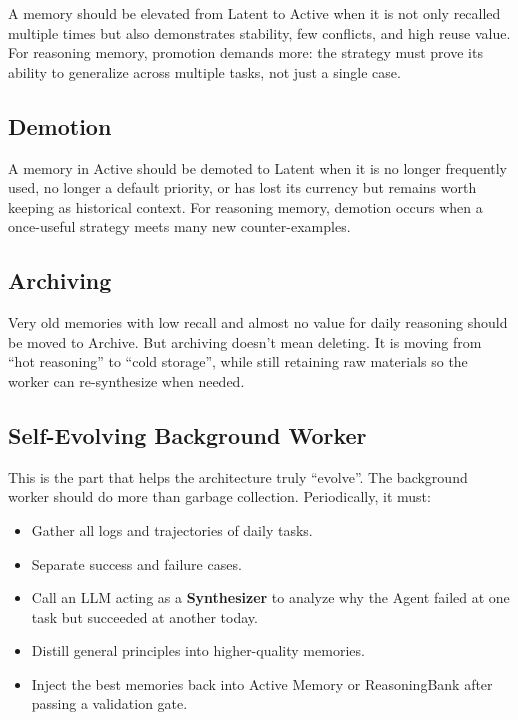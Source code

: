 \documentclass[a4paper,12pt]{article}
\begin{document}
A memory should be elevated from Latent to Active when it is not only recalled multiple times but also demonstrates stability, few conflicts, and high reuse value. For reasoning memory, promotion demands more: the strategy must prove its ability to generalize across multiple tasks, not just a single case.

\subsection*{Demotion}

A memory in Active should be demoted to Latent when it is no longer frequently used, no longer a default priority, or has lost its currency but remains worth keeping as historical context. For reasoning memory, demotion occurs when a once-useful strategy meets many new counter-examples.

\subsection*{Archiving}

Very old memories with low recall and almost no value for daily reasoning should be moved to Archive. But archiving doesn't mean deleting. It is moving from ``hot reasoning'' to ``cold storage'', while still retaining raw materials so the worker can re-synthesize when needed.

\subsection*{Self-Evolving Background Worker}

This is the part that helps the architecture truly ``evolve''. The background worker should do more than garbage collection. Periodically, it must:
\begin{itemize}
    \item Gather all logs and trajectories of daily tasks.
    \item Separate success and failure cases.
    \item Call an LLM acting as a \textbf{Synthesizer} to analyze why the Agent failed at one task but succeeded at another today.
    \item Distill general principles into higher-quality memories.
    \item Inject the best memories back into Active Memory or ReasoningBank after passing a validation gate.
\end{itemize}
\end{document}
